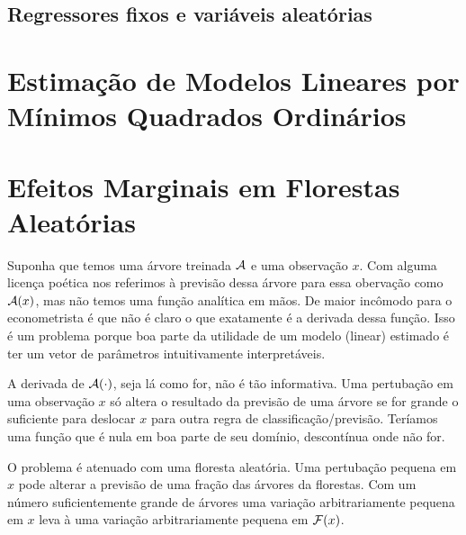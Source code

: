 \subsection{Regressores fixos e variáveis aleatórias}

\section{Estimação de Modelos Lineares por Mínimos Quadrados Ordinários}



\section{Efeitos Marginais em Florestas Aleatórias}

Suponha que temos uma árvore treinada $\mathcal{A}$ e uma observação $x$. Com alguma licença poética nos referimos à previsão dessa árvore para essa obervação como $\mathcal{A}(x)$, mas não temos uma função analítica em mãos. De maior incômodo para o econometrista é que não é claro o que exatamente é a derivada dessa função. Isso é um problema porque boa parte da utilidade de um modelo (linear) estimado é ter um vetor de parâmetros intuitivamente interpretáveis. 

A derivada de $\mathcal{A}(\cdot)$, seja lá como for, não é tão informativa. Uma pertubação em uma observação $x$ só altera o resultado da previsão de uma árvore se for grande o suficiente para deslocar $x$ para outra regra de classificação/previsão. Teríamos uma função que é nula em boa parte de seu domínio, descontínua onde não for. 

O problema é atenuado com uma floresta aleatória. Uma pertubação pequena em $x$ pode alterar a previsão de uma fração das árvores da florestas. Com um número suficientemente grande de árvores uma variação arbitrariamente pequena em $x$ leva à uma variação arbitrariamente pequena em $\mathcal{F}(x)$.


